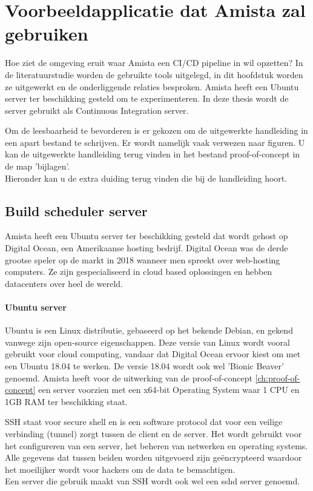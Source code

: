     \section{Voorbeeldapplicatie dat Amista zal gebruiken}
    Hoe ziet de omgeving eruit waar Amista een CI/CD pipeline in wil opzetten? In de literatuurstudie worden de gebruikte tools uitgelegd, in dit hoofdstuk worden ze uitgewerkt en de onderliggende relaties besproken.
    Amista heeft een Ubuntu server ter beschikking gesteld om te experimenteren. In deze thesis wordt de server gebruikt als Continuous Integration server.
    
    Om de leesbaarheid te bevorderen is er gekozen om de uitgewerkte handleiding in een apart bestand te schrijven. Er wordt namelijk vaak verwezen naar figuren. U kan de uitgewerkte handleiding terug vinden in het bestand proof-of-concept in de map 'bijlagen'.\\
    Hieronder kan u de extra duiding terug vinden die bij de handleiding hoort.
    
        \subsection{Build scheduler server}
        Amista heeft een Ubuntu server ter beschikking gesteld dat wordt gehost op Digital Ocean, een Amerikaanse hosting bedrijf. Digital Ocean was de derde grootse speler op de markt in 2018 wanneer men spreekt over web-hosting computers. Ze zijn gespecialiseerd in cloud based oplossingen en hebben datacenters over heel de wereld.
            
            \paragraph{Ubuntu server}
            Ubuntu is een Linux distributie, gebaseerd op het bekende Debian, en gekend vanwege zijn open-source eigenschappen.
            Deze versie van Linux wordt vooral gebruikt voor cloud computing, vandaar dat Digital Ocean ervoor kiest om met een Ubuntu 18.04 te werken.
            De versie 18.04 wordt ook wel 'Bionic Beaver' genoemd.
            Amista heeft voor de uitwerking van de proof-of-concept \ref{ch:proof-of-concept} een server voorzien met een x64-bit Operating System waar 1 CPU en 1GB RAM ter beschikking staat.
            
            SSH staat voor secure shell en is een software protocol dat voor een veilige verbinding (tunnel) zorgt tussen de client en de server. Het wordt gebruikt voor het configureren van een server, het beheren van netwerken en operating systems. Alle gegevens dat tussen beiden worden uitgevoerd zijn geëncrypteerd waardoor het moeilijker wordt voor hackers om de data te bemachtigen.\\
            Een server die gebruik maakt van SSH wordt ook wel een sshd server genoemd. 
            

